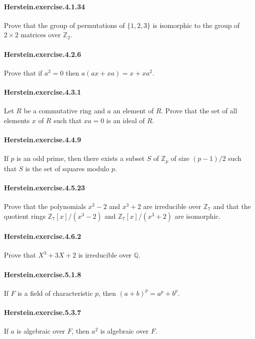 \documentclass{article}
\begin{document}
\paragraph{Herstein.exercise.4.1.34} Prove that the group of permutations of $\{1, 2, 3\}$ is isomorphic to the group of $2\times 2$ matrices over $\mathbb{Z}_2$.

\paragraph{Herstein.exercise.4.2.6} Prove that if $a^2=0$ then $a(ax+xa)=x+xa^2$.

\paragraph{Herstein.exercise.4.3.1} Let $R$ be a commutative ring and $a$ an element of $R$. Prove that the set of all elements $x$ of $R$ such that $xa=0$ is an ideal of $R$.

\paragraph{Herstein.exercise.4.4.9} If $p$ is an odd prime, then there exists a subset $S$ of $\mathbb{Z}_p$ of size $(p-1)/2$ such that $S$ is the set of squares modulo $p$.

\paragraph{Herstein.exercise.4.5.23} Prove that the polynomials $x^3-2$ and $x^3+2$ are irreducible over $\mathbb{Z}_7$ and that the quotient rings $\mathbb{Z}_7[x]/(x^3-2)$ and $\mathbb{Z}_7[x]/(x^3+2)$ are isomorphic.

\paragraph{Herstein.exercise.4.6.2} Prove that $X^3 + 3X + 2$ is irreducible over $\mathbb{Q}$.

\paragraph{Herstein.exercise.5.1.8} If $F$ is a field of characteristic $p$, then $(a+b)^p = a^p + b^p$.

\paragraph{Herstein.exercise.5.3.7} If $a$ is algebraic over $F$, then $a^2$ is algebraic over $F$.
\end{document}
